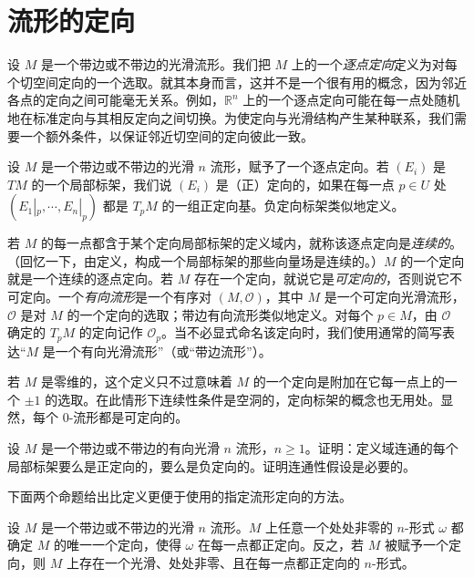 \documentclass[../../main.tex]{subfiles}
\begin{document}
\section{流形的定向}\label{section:ch15-manifolds}

设 $M$ 是一个带边或不带边的光滑流形。我们把 $M$ 上的一个\emph{逐点定向}定义为对每个切空间定向的一个选取。就其本身而言，这并不是一个很有用的概念，因为邻近各点的定向之间可能毫无关系。例如，$\mathbb{R}^n$ 上的一个逐点定向可能在每一点处随机地在标准定向与其相反定向之间切换。为使定向与光滑结构产生某种联系，我们需要一个额外条件，以保证邻近切空间的定向彼此一致。

设 $M$ 是一个带边或不带边的光滑 $n$ 流形，赋予了一个逐点定向。若 $(E_i)$ 是 $TM$ 的一个局部标架，我们说 $(E_i)$ 是（正）定向的，如果在每一点 $p\in U$ 处 $(E_1|_p,\cdots ,E_n|_p)$ 都是 $T_pM$ 的一组正定向基。负定向标架类似地定义。

若 $M$ 的每一点都含于某个定向局部标架的定义域内，就称该逐点定向是\emph{连续的}。（回忆一下，由定义，构成一个局部标架的那些向量场是连续的。）$M$ 的一个定向就是一个连续的逐点定向。若 $M$ 存在一个定向，就说它是\emph{可定向的}，否则说它不可定向。一个\emph{有向流形}是一个有序对 $(M,\mathcal O)$，其中 $M$ 是一个可定向光滑流形，$\mathcal O$ 是对 $M$ 的一个定向的选取；带边有向流形类似地定义。对每个 $p\in M$，由 $\mathcal O$ 确定的 $T_pM$ 的定向记作 $\mathcal O_p$。当不必显式命名该定向时，我们使用通常的简写表达“$M$ 是一个有向光滑流形”（或“带边流形”）。

若 $M$ 是零维的，这个定义只不过意味着 $M$ 的一个定向是附加在它每一点上的一个 $\pm1$ 的选取。在此情形下连续性条件是空洞的，定向标架的概念也无用处。显然，每个 $0$-流形都是可定向的。

\begin{exercise}\label{exercise:ch15-04}
设 $M$ 是一个带边或不带边的有向光滑 $n$ 流形，$n\geqslant1$。证明：定义域连通的每个局部标架要么是正定向的，要么是负定向的。证明连通性假设是必要的。
\end{exercise}

下面两个命题给出比定义更便于使用的指定流形定向的方法。

\begin{proposition}[$n$-形式所确定的定向]\label{proposition:ch15-nform-orientation}
设 $M$ 是一个带边或不带边的光滑 $n$ 流形。$M$ 上任意一个处处非零的 $n$-形式 $\omega$ 都确定 $M$ 的唯一一个定向，使得 $\omega$ 在每一点都正定向。反之，若 $M$ 被赋予一个定向，则 $M$ 上存在一个光滑、处处非零、且在每一点都正定向的 $n$-形式。
\end{proposition}
\end{document}
